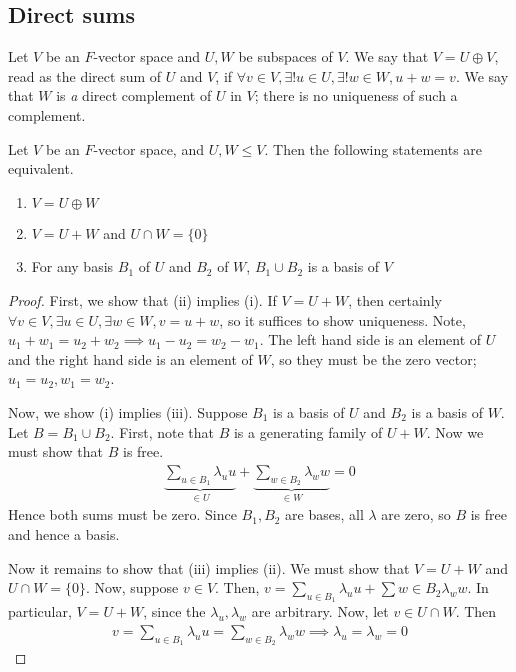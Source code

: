 \subsection{Direct sums}
\begin{definition}
    Let $V$ be an $F$-vector space and $U, W$ be subspaces of $V$.
    We say that $V = U \oplus V$, read as the direct sum of $U$ and $V$, if $\forall v \in V, \exists!
    u \in U, \exists!
    w \in W, u + w = v$.
    We say that $W$ is \textit{a} direct complement of $U$ in $V$; there is no uniqueness of such a complement.
\end{definition}
\begin{lemma}
    Let $V$ be an $F$-vector space, and $U, W \leq V$.
    Then the following statements are equivalent.
    \begin{enumerate}
        \item $V = U \oplus W$
        \item $V = U + W$ and $U \cap W = \{0\}$
        \item For any basis $B_1$ of $U$ and $B_2$ of $W$, $B_1 \cup B_2$ is a basis of $V$
    \end{enumerate}
\end{lemma}
\begin{proof}
    First, we show that (ii) implies (i).
    If $V = U + W$, then certainly $\forall v \in V, \exists u \in U, \exists w \in W, v = u + w$, so it suffices to show uniqueness.
    Note, $u_1 + w_1 = u_2 + w_2 \implies u_1 - u_2 = w_2 - w_1$.
    The left hand side is an element of $U$ and the right hand side is an element of $W$, so they must be the zero vector; $u_1 = u_2, w_1 = w_2$.

    Now, we show (i) implies (iii).
    Suppose $B_1$ is a basis of $U$ and $B_2$ is a basis of $W$.
    Let $B = B_1 \cup B_2$.
    First, note that $B$ is a generating family of $U + W$.
    Now we must show that $B$ is free.
    \begin{align*}
        \underbrace{\sum_{u \in B_1} \lambda_u u}_{\in U} + \underbrace{\sum_{w \in B_2} \lambda_w w}_{\in W} = 0
    \end{align*}
    Hence both sums must be zero.
    Since $B_1, B_2$ are bases, all $\lambda$ are zero, so $B$ is free and hence a basis.

    Now it remains to show that (iii) implies (ii).
    We must show that $V = U + W$ and $U \cap W = \{0\}$.
    Now, suppose $v \in V$.
    Then, $v = \sum_{u \in B_1} \lambda_u u + \sum{w \in B_2} \lambda_w w$.
    In particular, $V = U + W$, since the $\lambda_u, \lambda_w$ are arbitrary.
    Now, let $v \in U \cap W$.
    Then
    \begin{align*}
        v = \sum_{u \in B_1} \lambda_u u = \sum_{w \in B_2} \lambda_w w \implies \lambda_u = \lambda_w = 0
    \end{align*}
\end{proof}

